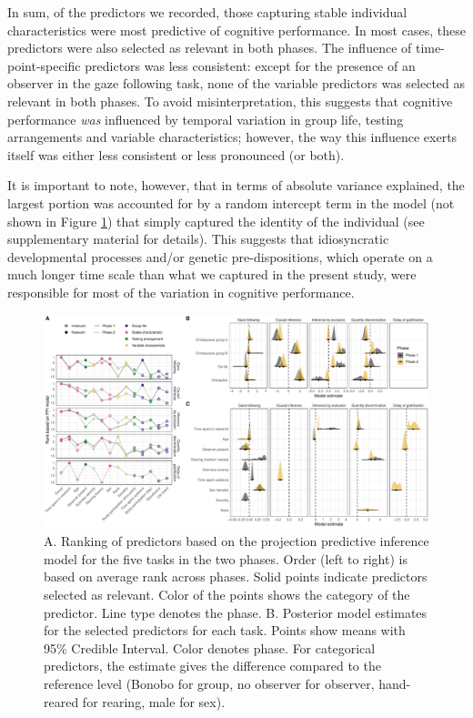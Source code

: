 \documentclass[
  man,floatsintext]{apa6}
\begin{document}
In sum, of the predictors we recorded, those capturing stable individual characteristics were most predictive of cognitive performance. In most cases, these predictors were also selected as relevant in both phases. The influence of time-point-specific predictors was less consistent: except for the presence of an observer in the gaze following task, none of the variable predictors was selected as relevant in both phases. To avoid misinterpretation, this suggests that cognitive performance \emph{was} influenced by temporal variation in group life, testing arrangements and variable characteristics; however, the way this influence exerts itself was either less consistent or less pronounced (or both).

It is important to note, however, that in terms of absolute variance explained, the largest portion was accounted for by a random intercept term in the model (not shown in Figure \ref{fig:ppiplot}) that simply captured the identity of the individual (see supplementary material for details). This suggests that idiosyncratic developmental processes and/or genetic pre-dispositions, which operate on a much longer time scale than what we captured in the present study, were responsible for most of the variation in cognitive performance.

\begin{figure}

{\centering \includegraphics[width=1\linewidth]{./figures/ppi3_i7} 

}

\caption{A. Ranking of predictors based on the projection predictive inference model for the five tasks in the two phases. Order (left to right) is based on average rank across phases. Solid points indicate predictors selected as relevant. Color of the points shows the category of the predictor. Line type denotes the phase. B. Posterior model estimates for the selected predictors for each task. Points show means with 95\% Credible Interval. Color denotes phase. For categorical predictors, the estimate gives the difference compared to the reference level (Bonobo for group, no observer for observer, hand-reared for rearing, male for sex).}\label{fig:ppiplot}
\end{figure}
\end{document}
